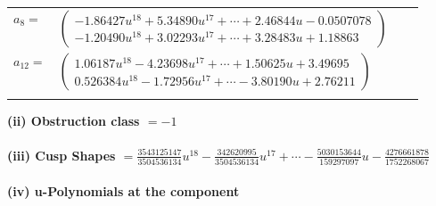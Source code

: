 \documentclass[1p]{elsarticle_modified}
\theoremstyle{definition}
\begin{document}
\begin{tabular}{m{7pt} m{180pt} m{7pt} m{180pt} }
\flushright $a_{8}=$&$\begin{pmatrix}-1.86427 u^{18}+5.34890 u^{17}+\cdots+2.46844 u-0.0507078\\-1.20490 u^{18}+3.02293 u^{17}+\cdots+3.28483 u+1.18863\end{pmatrix}$ \\
\flushright $a_{12}=$&$\begin{pmatrix}1.06187 u^{18}-4.23698 u^{17}+\cdots+1.50625 u+3.49695\\0.526384 u^{18}-1.72956 u^{17}+\cdots-3.80190 u+2.76211\end{pmatrix}$\\&\end{tabular}
\flushleft \textbf{(ii) Obstruction class $= -1$}\\~\\
\flushleft \textbf{(iii) Cusp Shapes $= \frac{3543125147}{3504536134} u^{18}-\frac{342620995}{3504536134} u^{17}+\cdots-\frac{5030153644}{159297097} u-\frac{4276661878}{1752268067}$}\\~\\
\newpage\renewcommand{\arraystretch}{1}
\flushleft \textbf{(iv) u-Polynomials at the component}\newline \\
\end{document}
